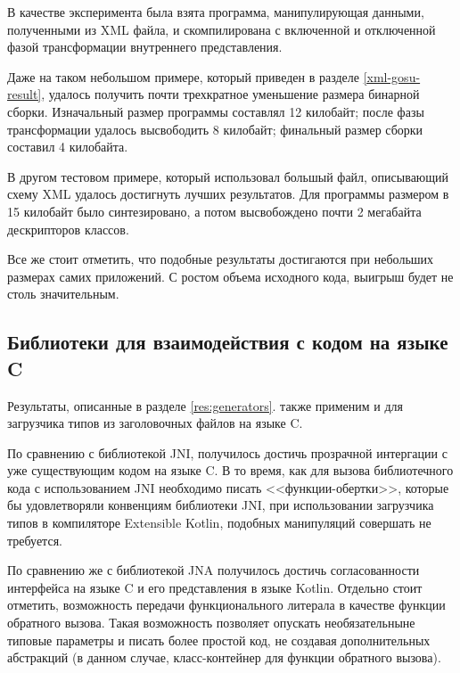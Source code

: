 В качестве эксперимента была взята программа, манипулирующая данными, полученными из XML файла, и скомпилирована с включенной и отключенной фазой трансформации внутреннего представления.

Даже на таком небольшом примере, который приведен в разделе \ref{xml-gosu-result}, удалось получить почти трехкратное уменьшение размера бинарной сборки. Изначальный размер программы составлял 12 килобайт; после фазы трансформации удалось высвободить 8 килобайт; финальный размер сборки составил 4 килобайта.

В другом тестовом примере, который использовал большый файл, описывающий схему XML удалось достигнуть лучших результатов. Для программы размером в 15 килобайт было синтезировано, а потом высвобождено почти 2 мегабайта дескрипторов классов.

Все же стоит отметить, что подобные результаты достигаются при небольших размерах самих приложений.
С ростом объема исходного кода, выигрыш будет не столь значительным.

\subsection{Библиотеки для взаимодействия с кодом на языке C}
Результаты, описанные в разделе \ref{res:generators}. также применим и для загрузчика типов из заголовочных файлов на языке C.

По сравнению с библиотекой JNI, получилось достичь прозрачной интергации с уже существующим кодом на языке C.
В то время, как для вызова библиотечного кода с использованием JNI необходимо писать <<функции-обертки>>, которые бы удовлетворяли конвенциям библиотеки JNI, при использовании загрузчика типов в компиляторе Extensible Kotlin, подобных манипуляций совершать не требуется.

По сравнению же с библиотекой JNA получилось достичь согласованности интерфейса на языке C и его представления в языке Kotlin. Отдельно стоит отметить, возможность передачи функционального литерала в качестве функции обратного вызова.
Такая возможность позволяет опускать необязательныне типовые параметры и писать более простой код, не создавая дополнительных абстракций (в данном случае, класс-контейнер для функции обратного вызова).